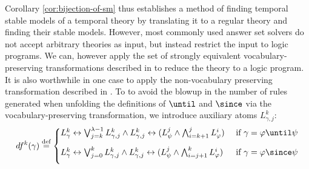 Corollary \ref{cor:bijection-of-sm} thus establishes a method of
finding temporal stable models of a temporal theory by translating it
to a regular theory and finding their stable models. However, most
commonly used answer set solvers do not accept arbitrary theories as
input, but instead restrict the input to logic programs. We can,
however apply the set of strongly equivalent vocabulary-preserving
transformations described in \cite{capeva05a} to reduce the theory to
a logic program. It is also worthwhile in one case to apply the
non-vocabulary preserving transformation described in
\cite{capeva05a}. To to avoid the blowup in the number of rules
generated when unfolding the definitions of $\until$ and $\since$ via
the vocabulary-preserving transformation, we introduce auxiliary atoms
$L_{\gamma,j}^k$:
\begin{align*}
df^k(\gamma) \defeq \begin{cases}
  L^k_{\gamma} \leftrightarrow \bigvee_{j=k}^{\lambda-1}L_{\gamma,j}^k \wedge L_{\gamma,j}^k \leftrightarrow 
(L_\psi^j \wedge \bigwedge_{i=k+1}^{j}L_{\varphi}^i)
  &\text{ if } \gamma = \varphi \until \psi \\[2ex]
  L^k_{\gamma} \leftrightarrow  \bigvee_{j=0}^{k} L_{\gamma,j}^k \wedge L_{\gamma,j}^k \leftrightarrow (L_\psi^j \wedge \bigwedge_{i=j+1}^{k}L_{\varphi}^i)
  &\text{ if } \gamma = \varphi \since \psi \\[2ex]
\end{cases}
\end{align*}